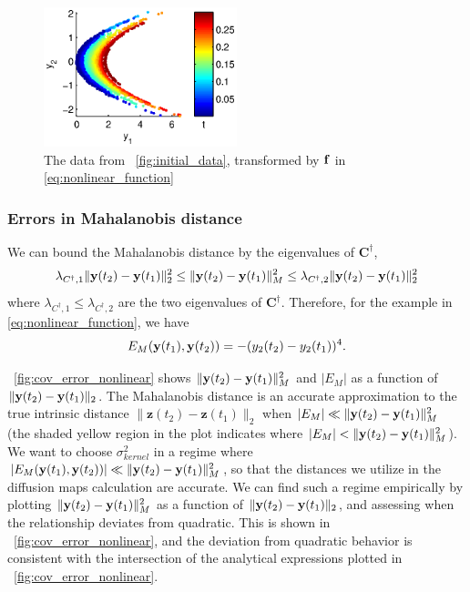 \begin{figure}[t]
\centering
\includegraphics[width=0.5\textwidth]{data_init_nonlinear}
%
\caption[Nonlinear multiscale data]{The data from \fig~\ref{fig:initial_data}, transformed by $\mathbf{f}$ in \eqref{eq:nonlinear_function}}
\label{fig:initial_data_nonlinear}
\end{figure}

\subsubsection{Errors in Mahalanobis distance}

We can bound the Mahalanobis distance by the eigenvalues of $\mathbf{C}^{\dagger}$,
\begin{equation}
\lambda_{C^{\dagger},1} \| \mathbf{y}(t_2) - \mathbf{y}(t_1) \|_2^2
\le
\| \mathbf{y}(t_2) - \mathbf{y}(t_1) \|^2_M
\le
\lambda_{C^{\dagger},2} \| \mathbf{y}(t_2) - \mathbf{y}(t_1) \|_2^2
\end{equation}
where $\lambda_{C^{\dagger},1} \le \lambda_{C^{\dagger},2}$ are the two eigenvalues of $\mathbf{C}^{\dagger}$.
%
Therefore, for the example in \eqref{eq:nonlinear_function}, we have
\begin{equation}
E_M(\mathbf{y}(t_1), \mathbf{y}(t_2)) = - (y_2(t_2) - y_2(t_1))^4.
\end{equation}

\fig~\ref{fig:cov_error_nonlinear} shows $\| \mathbf{y}(t_2) - \mathbf{y}(t_1) \|^2_M$ and $| E_M |$ as a function of $\| \mathbf{y}(t_2) - \mathbf{y}(t_1) \|_2$.
%
The Mahalanobis distance is an accurate approximation to the true intrinsic distance $\| \mathbf{z}(t_2) - \mathbf{z}(t_1) \|_2$ when $|E_M| \ll \| \mathbf{y}(t_2) - \mathbf{y}(t_1) \|^2_M$ (the shaded yellow region in the plot indicates where $|E_M| < \| \mathbf{y}(t_2) - \mathbf{y}(t_1) \|^2_M$).
%
We want to choose $\sigma_{kernel}^2$ in a regime where $|E_M(\mathbf{y}(t_1), \mathbf{y}(t_2))| \ll \| \mathbf{y}(t_2) - \mathbf{y}(t_1) \|^2_M$, so that the distances we utilize in the diffusion maps calculation are accurate.
%
We can find such a regime empirically by plotting $\| \mathbf{y}(t_2) - \mathbf{y}(t_1) \|^2_M$ as a function of $\| \mathbf{y}(t_2) - \mathbf{y}(t_1) \|_2$, and assessing when the relationship deviates from quadratic.
%
This is shown in \fig~\ref{fig:cov_error_nonlinear}, and the deviation from quadratic behavior is consistent with the intersection of the analytical expressions plotted in \fig~\ref{fig:cov_error_nonlinear}.

